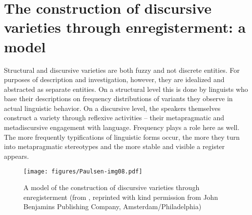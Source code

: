 \section{The construction of discursive varieties through enregisterment: a model}
\label{bkm:Ref523897668}\hypertarget{Toc63021215}{}\label{bkm:Ref523899116}
Structural and discursive varieties are both fuzzy and not discrete entities. For purposes of description and investigation, however, they are idealized and abstracted as separate entities. On a structural level this is done by linguists who base their descriptions on frequency distributions of variants they observe in actual linguistic behavior. On a discursive level, the speakers themselves construct a variety through reflexive activities – their metapragmatic and metadiscursive engagement with language. Frequency plays a role here as well. The more frequently typifications of linguistic forms occur, the more they turn into metapragmatic stereotypes and the more stable and visible a register appears.


\begin{figure}
\texttt{[image: figures/Paulsen-img08.pdf]}
\caption{
A model of the construction of discursive varieties through enregisterment (from \citet{Paulsenforthcoming}, reprinted with kind permission from John Benjamins Publishing Company, Amsterdam/Philadelphia)
}
\label{fig:2:8}
\end{figure}


